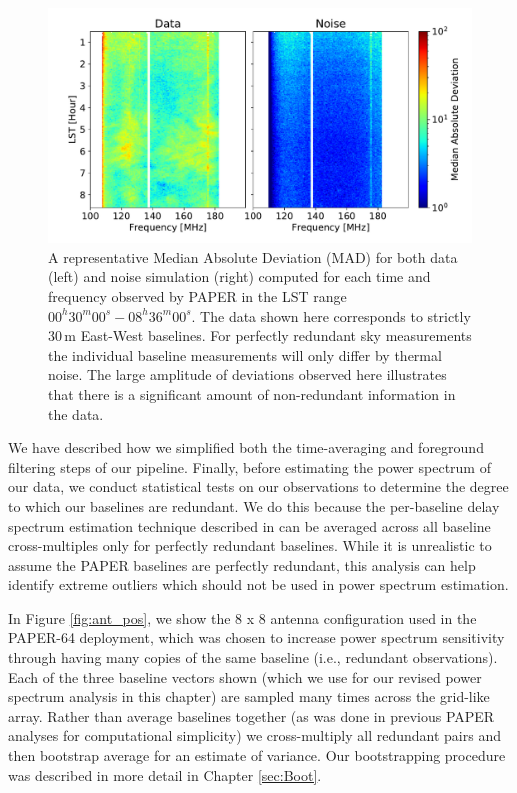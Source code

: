 \begin{figure}[tp]
	\centering
	\includegraphics[width=.85\textwidth]{plots/data_noise_mad_O.pdf}
	\caption{A representative Median Absolute Deviation (MAD) for both data (left)
		and noise simulation (right) computed for each time and frequency observed by
		PAPER in the LST range $00^{h}30^{m}00^{s} - 08^{h}36^{m}00^{s}$.
    The data shown here corresponds to
		strictly 30\,m East-West baselines.
		For perfectly redundant sky measurements the individual
		baseline measurements will only differ by thermal noise.
		The large amplitude of deviations observed here
		illustrates that there is a significant
		amount of non-redundant information in the data.}\label{fig:mad}
\end{figure}

We have described how we simplified both the time-averaging and foreground filtering steps of our pipeline. Finally, before estimating the power spectrum of our data, we conduct statistical tests on our observations to determine the degree to which
our baselines are redundant.
We do this because the per-baseline delay spectrum
estimation technique described in \citet{parsons_et_al2012b}
can be averaged across all baseline cross-multiples only for
perfectly redundant baselines. While it is unrealistic to assume
the PAPER baselines are perfectly redundant, this analysis can
help identify extreme outliers which should not be used in
power spectrum estimation.

In Figure \ref{fig:ant_pos}, we show the 8 x 8 antenna configuration used in the PAPER-64 deployment, which was chosen to increase power spectrum sensitivity through having many copies of the same baseline (i.e., redundant observations). Each of the three baseline vectors shown  (which we use for our revised power spectrum analysis in this chapter) are
sampled many times across the grid-like array. Rather than average
baselines together (as was done in previous PAPER analyses for computational simplicity)
we cross-multiply all redundant pairs and then bootstrap average for
an estimate of variance. Our bootstrapping procedure was described in more detail in Chapter \ref{sec:Boot}.

